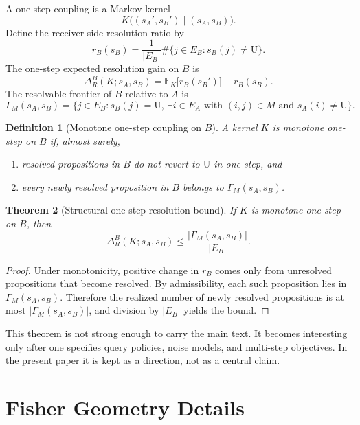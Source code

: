 \documentclass[11pt]{article}
\newtheorem{definition}{Definition}[section]
\newtheorem{theorem}[definition]{Theorem}
\newcommand{\U}{\mathrm{U}}
\newcommand{\E}{\mathbb{E}}
\newcommand{\1}{\mathbf{1}}
\begin{document}
A one-step coupling is a Markov kernel
\[
K\bigl((s_A',s_B')\mid(s_A,s_B)\bigr).
\]
Define the receiver-side resolution ratio by
\[
r_B(s_B)=\frac{1}{|E_B|}\#\{j\in E_B:s_B(j)\neq \U\}.
\]
The one-step expected resolution gain on $B$ is
\[
\Delta_R^B(K;s_A,s_B)=\E_K\bigl[r_B(s_B')\bigr]-r_B(s_B).
\]
The resolvable frontier of $B$ relative to $A$ is
\[
\Gamma_M(s_A,s_B)
=
\{j\in E_B:s_B(j)=\U,\ \exists i\in E_A\text{ with }(i,j)\in M\text{ and }s_A(i)\neq \U\}.
\]

\begin{definition}[Monotone one-step coupling on $B$]
A kernel $K$ is monotone one-step on $B$ if, almost surely,
\begin{enumerate}[leftmargin=1.5em]
    \item resolved propositions in $B$ do not revert to $\U$ in one step, and
    \item every newly resolved proposition in $B$ belongs to $\Gamma_M(s_A,s_B)$.
\end{enumerate}
\end{definition}

\begin{theorem}[Structural one-step resolution bound]
If $K$ is monotone one-step on $B$, then
\[
\Delta_R^B(K;s_A,s_B)
\le
\frac{|\Gamma_M(s_A,s_B)|}{|E_B|}.
\]
\end{theorem}

\begin{proof}
Under monotonicity, positive change in $r_B$ comes only from unresolved propositions that become resolved. By admissibility, each such proposition lies in $\Gamma_M(s_A,s_B)$. Therefore the realized number of newly resolved propositions is at most $|\Gamma_M(s_A,s_B)|$, and division by $|E_B|$ yields the bound.
\end{proof}

This theorem is not strong enough to carry the main text. It becomes interesting only after one specifies query policies, noise models, and multi-step objectives. In the present paper it is kept as a direction, not as a central claim.

\section{Fisher Geometry Details}
\label{app:fisher}
\end{document}
